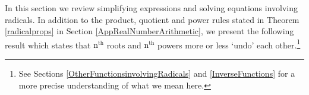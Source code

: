 \documentclass{ximera}
\begin{document}
	\author{Stitz-Zeager}




\setcounter{footnote}{0}

\label{AppRadEqus}

In this section we review simplifying expressions and solving equations involving radicals.  In addition to the product, quotient and power rules stated in Theorem \ref{radicalprops} in Section \ref{AppRealNumberArithmetic},  we present the following result which states that $\text{n}^{\text{th}}$ roots and $\text{n}^{\text{th}}$ powers more or less `undo' each other.\footnote{See Sections \ref{OtherFunctionsinvolvingRadicals} and \ref{InverseFunctions} for a more precise understanding of what we mean here.} 

\medskip
\end{document}
